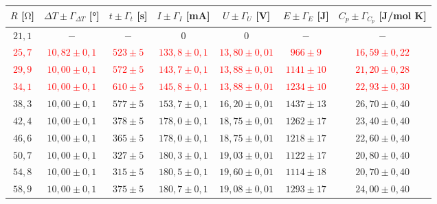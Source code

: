 \begin{table}
[H]
\begin{tabular}{ccccccc}

  \toprule
$R$ [$\si{\ohm}$] & $\Delta{T}\pm\Gamma_{\Delta{T}}$ [°] & $t \pm \Gamma_t$ [s] & $I \pm \Gamma_I$ [mA] & $U \pm \Gamma_U$ [V] & $E \pm \Gamma_E$ [J] & $C_p \pm \Gamma_{C_p} $ [J/mol K]\\

\midrule
$21,1$ & $-            $ & $ -       $ & $0            $ & $0             $ & $-$            & $-$              \\

\textcolor{red}{$25,7$} & \textcolor{red}{$10,82 \pm 0,1$} & \textcolor{red}{$523 \pm 5$} & \textcolor{red}{$133,8 \pm 0,1$}
& \textcolor{red}{$13,80 \pm 0,01$} & \textcolor{red}{$ 966 \pm  9$}  & \textcolor{red}{$16,59 \pm 0,22$} \\

\textcolor{red}{$29,9$} & \textcolor{red}{$10,00 \pm 0,1$} & \textcolor{red}{$572 \pm 5$} & \textcolor{red}{$143,7 \pm 0,1$}
& \textcolor{red}{$13,88 \pm 0,01$} & \textcolor{red}{$1141 \pm 10$}  & \textcolor{red}{$21,20 \pm 0,28$} \\
\textcolor{red}{$34,1$} & \textcolor{red}{$10,00 \pm 0,1$} & \textcolor{red}{$610 \pm 5$} & \textcolor{red}{$145,8 \pm 0,1$}
& \textcolor{red}{$13,88 \pm 0,01$} & \textcolor{red}{$1234 \pm 10$}  & \textcolor{red}{$22,93 \pm 0,30$} \\
$38,3$ & $10,00 \pm 0,1$ & $577 \pm 5$ & $153,7 \pm 0,1$ & $16,20 \pm 0,01$ & $1437 \pm 13$  & $26,70 \pm 0,40$ \\

$42,4$ & $10,00 \pm 0,1$ & $378 \pm 5$ & $178,0 \pm 0,1$ & $18,75 \pm 0,01$ & $1262 \pm 17$  & $23,40 \pm 0,40$ \\

$46,6$ & $10,00 \pm 0,1$ & $365 \pm 5$ & $178,0 \pm 0,1$ & $18,75 \pm 0,01$ & $1218 \pm 17$  & $22,60 \pm 0,40$ \\

$50,7$ & $10,00 \pm 0,1$ & $327 \pm 5$ & $180,3 \pm 0,1$ & $19,03 \pm 0,01$ & $1122 \pm 17$  & $20,80 \pm 0,40$ \\

$54,8$ & $10,00 \pm 0,1$ & $315 \pm 5$ & $180,5 \pm 0,1$ & $19,60 \pm 0,01$ & $1114 \pm 18$  & $20,70 \pm 0,40$ \\

$58,9$ & $10,00 \pm 0,1$ & $375 \pm 5$ & $180,7 \pm 0,1$ & $19,08 \pm 0,01$ & $1293 \pm 17$  & $24,00 \pm 0,40$ \\


\end{tabular}
\end{table}
